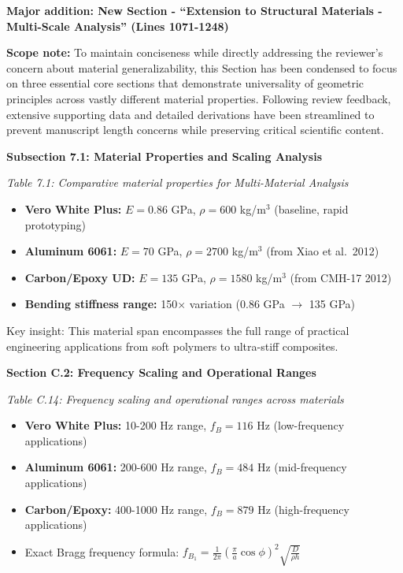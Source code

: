 \documentclass[11pt,a4paper]{article}
\newenvironment{changesbox}{%
    \par\medskip\noindent{\color{changescolor}\rule{\linewidth}{2pt}}\par
    \noindent{\color{changescolor}\bfseries Manuscript Changes}\par\smallskip
}{%
    \par\noindent{\color{changescolor}\rule{\linewidth}{0.5pt}}\medskip
}
\begin{document}
\begin{changesbox}
\textbf{Major addition: New Section - ``Extension to Structural Materials - Multi-Scale Analysis'' (Lines 1071-1248)}

\textbf{Scope note:} To maintain conciseness while directly addressing the reviewer's concern about material generalizability, this Section has been condensed to focus on three essential core sections that demonstrate universality of geometric principles across vastly different material properties. Following review feedback, extensive supporting data and detailed derivations have been streamlined to prevent manuscript length concerns while preserving critical scientific content.

\textbf{Subsection 7.1: Material Properties and Scaling Analysis}

\textit{Table 7.1: Comparative material properties for Multi-Material Analysis}
\begin{itemize}
    \item \textbf{Vero White Plus:} $E = 0.86$ GPa, $\rho = 600$ kg/m$^3$ (baseline, rapid prototyping)
    \item \textbf{Aluminum 6061:} $E = 70$ GPa, $\rho = 2700$ kg/m$^3$ (from Xiao et al.~2012)
    \item \textbf{Carbon/Epoxy UD:} $E = 135$ GPa, $\rho = 1580$ kg/m$^3$ (from CMH-17 2012)
    \item \textbf{Bending stiffness range:} 150$\times$ variation (0.86 GPa $\to$ 135 GPa)
\end{itemize}

Key insight: This material span encompasses the full range of practical engineering applications from soft polymers to ultra-stiff composites.

\textbf{Section C.2: Frequency Scaling and Operational Ranges}

\textit{Table C.14: Frequency scaling and operational ranges across materials}
\begin{itemize}
    \item \textbf{Vero White Plus:} 10-200 Hz range, $f_B = 116$ Hz (low-frequency applications)
    \item \textbf{Aluminum 6061:} 200-600 Hz range, $f_B = 484$ Hz (mid-frequency applications)
    \item \textbf{Carbon/Epoxy:} 400-1000 Hz range, $f_B = 879$ Hz (high-frequency applications)
    \item Exact Bragg frequency formula: $f_{B_1} = \frac{1}{2\pi}\left(\frac{\pi}{a}\cos\phi\right)^2 \sqrt{\frac{D}{\rho h}}$
\end{itemize}


\end{changesbox}
\end{document}
